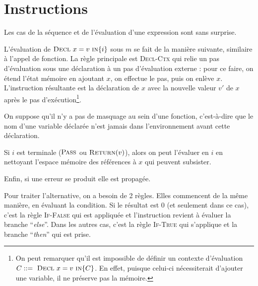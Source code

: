 \section{Instructions}
\label{sec:eval-instr}

Les cas de la séquence et de l'évaluation d'une expression sont sans surprise.

\begin{mathpar}

\end{mathpar}

L'évaluation de $\iDecl{x}{v}{i}$ sous $m$ se fait de la manière suivante,
similaire à l'appel de fonction.
La règle principale est \textsc{Decl-Ctx} qui relie un pas d'évaluation sous une
déclaration à un pas d'évaluation externe : pour ce faire, on étend l'état
mémoire en ajoutant $x$, on effectue le pas, puis on enlève $x$. L'instruction
résultante est la déclaration de $x$ avec la nouvelle valeur $v'$ de $x$ après
le pas d'exécution\footnote{
    On peut remarquer qu'il est impossible de définir un contexte d'évaluation
    $C \gramisa \iDecl{x}{v}{C}$. En effet, puisque celui-ci nécessiterait
    d'ajouter une variable, il ne préserve pas la mémoire.
}.

\label{page:decl-masquage}
On suppose qu'il n'y a pas de masquage au sein d'une fonction, c'est-à-dire que
le nom d'une variable déclarée n'est jamais dans l'environnement avant cette
déclaration.

Si $i$ est terminale ($\iPass$ ou $\iReturn{v}$), alors on peut l'évaluer en $i$
en nettoyant l'espace mémoire des références à $x$ qui peuvent subsister.

Enfin, si une erreur se produit elle est propagée.

\begin{mathpar}



\end{mathpar}

Pour traiter l'alternative, on a besoin de 2 règles. Elles commencent de la même
manière, en évaluant la condition. Si le résultat est 0 (et seulement dans ce
cas), c'est la règle \textsc{If-False} qui est appliquée et l'instruction
revient à évaluer la branche \enquote{\emph{else}}. Dans les autres cas, c'est
la règle \textsc{If-True} qui s'applique et la branche \enquote{\emph{then}} qui
est prise.

